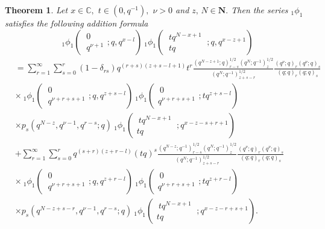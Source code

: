 \documentclass[12pt,a4paper]{amsart}
\numberwithin{equation}{section}
\theoremstyle{plain}
\newtheorem{theorem}{Theorem}[section]
\theoremstyle{definition}
\theoremstyle{remark}
\numberwithin{equation}{section}
\numberwithin{table}{section}
\numberwithin{figure}{section}
\begin{document}
\begin{theorem}
Let $x \in \mathbb{C},$ $t\in (0,q^{-1}),$ $\nu >0$ and $z,\,N \in
\mathbf{N}.$ Then the series $_{1}\phi_{1}$ satisfies the following
addition formula
\begin{equation}
\ _{1}\phi_1\left(\begin{matrix} \ 0\  \\
\ q^{\nu+1}\end{matrix};q,q^{x-l}\right)\ _{1}\phi_1\left(\begin{matrix} \ tq^{N-x+1}\  \\
\
tq\end{matrix};q,q^{x-z+1}\right) \label{41}
\end{equation}
\begin{align*}&=\sum_{r=1}^{\infty}\sum_{s=0}^{r}(1-\delta_{rs})q^{(r+s)(z+s-l+1)}t^r
\frac{(q^{N-z+1};q)_{r-s}^{1/2}(q^N;q^{-1})_z^{1/2}}{(q^N;q^{-1})_{z+s-r}^{1/2}}\frac{(q^{\nu};q)_r
(q^{\nu};q)_s}{(q;q)_r (q;q)_s}\\&
 \times
\ _{1}\phi_1\left(\begin{matrix} \ 0\  \\
\ q^{\nu+r+s+1}\end{matrix};q,q^{z+s-l}\right)\
_{1}\phi_1\left(\begin{matrix} \ 0 \   \\
q^{\nu+r+s+1}\end{matrix};tq^{z+s-l}\right)\\& \times
p_{s}(q^{N-z},q^{\nu-1},q^{r-s};q)\ _{1}\phi_1\left(\begin{matrix} \
tq^{N-x+1}\   \\
tq\end{matrix};q^{x-z-s+r+1}\right)\\&+\sum_{r=1}^{\infty}\sum_{s=0}^{r}q^{(s+r)(z+r-l)}(tq)^s
\frac{(q^{N-z};q^{-1})_{r-s}^{1/2}(q^N;q^{-1})_z^{1/2}}{(q^N;q^{-1})_{z+s-r}^{1/2}}\frac{(q^{\nu};q)_r
(q^{\nu};q)_s}{(q;q)_r (q;q)_s}
\\&\times
\ _{1}\phi_1\left(\begin{matrix} \ 0\  \\
\ q^{\nu+r+s+1}\end{matrix};q,q^{z+r-l}\right)\
_{1}\phi_1\left(\begin{matrix} \ 0 \   \\
q^{\nu+r+s+1}\end{matrix};tq^{z+r-l}\right)\\& \times
p_{s}(q^{N-z+s-r},q^{\nu-1},q^{r-s};q)\
_{1}\phi_1\left(\begin{matrix} \
tq^{N-x+1} \   \\
tq\end{matrix};q^{x-z-r+s+1}\right).
\end{align*}
\end{theorem}
\end{document}
